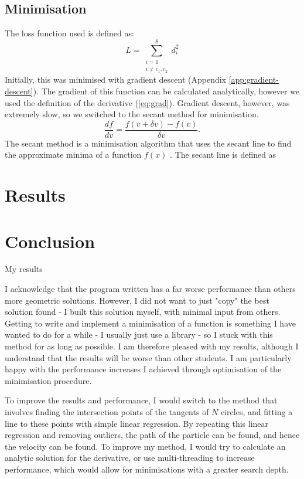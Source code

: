 \documentclass[11pt]{article}
\begin{document}
\subsection{Minimisation}
\label{sec:minimisation}
The loss function used is defined as:
\begin{equation}
    L = \sum\limits_{\substack{i=1 \\ i\neq c_1, c_2}}^{8} d_i^2
    \label{eq:loss}
\end{equation}
Initially, this was minimised with gradient descent (Appendix \ref{app:gradient-descent}). The gradient of this function can be calculated analytically, however we used the definition of the derivative (\autoref{eq:grad}). Gradient descent, however, was extremely slow, so we switched to the secant method for minimisation.
\begin{equation}
    \frac{df}{dv} = \frac{f(v + \delta v) - f(v)}{\delta v}.
    \label{eq:grad}
\end{equation}
The secant method is a minimisation algorithm that uses the secant line to find the approximate minima of a function $f(x)$ \cite{circle-tangents}. The secant line is defined as




\section{Results}
\label{sec:results}


\section{Conclusion}
\label{sec:conclusion}
My results

I acknowledge that the program written has a far worse performance than others more geometric solutions. However, I did not want to just "copy" the best solution found - I built this solution myself, with minimal input from others. Getting to write and implement a minimisation of a function is something I have wanted to do for a while - I usually just use a library - so I stuck with this method for as long as possible. I am therefore pleased with my results, although I understand that the results will be worse than other students. I am particularly happy with the performance increases I achieved through optimisation of the minimisation procedure.

To improve the results and performance, I would switch to the method that involves finding the intersection points of the tangents of $N$ circles, and fitting a line to these points with simple linear regression. By repeating this linear regression and removing outliers, the path of the particle can be found, and hence the velocity can be found. To improve my method, I would try to calculate an analytic solution for the derivative, or use multi-threading to increase performance, which would allow for minimisations with a greater search depth.
\end{document}
